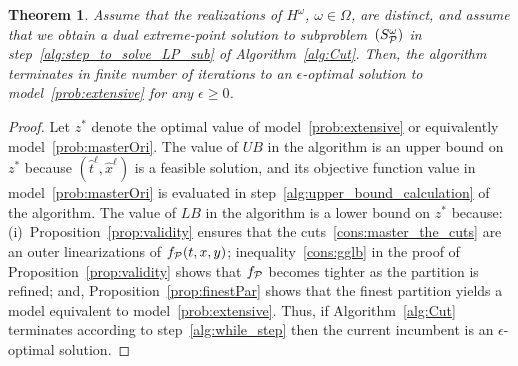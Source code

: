 \documentclass[11pt]{article}
\newtheorem{theorem}{Theorem}
\newcommand{\cP}{{\cal P}}
\begin{document}
	\begin{theorem} \label{thm:converge}
		Assume that the realizations of $H^\omega$, $\omega \in \Omega$, are distinct, and assume that we obtain a dual extreme-point solution to subproblem~\((S_{\cP}^\omega)\) in step~\ref{alg:step_to_solve_LP_sub} of Algorithm~\ref{alg:Cut}. Then, the algorithm terminates in finite number of iterations to an $\epsilon$-optimal solution to model~\eqref{prob:extensive} for any \(\epsilon \ge 0\). 
	\end{theorem}
	\begin{proof}
	Let $z^*$ denote the optimal value of model~\eqref{prob:extensive} or equivalently model~\eqref{prob:masterOri}. The value of $UB$ in the algorithm is an upper bound on $z^*$ because $(\hat{t}^\ell,\hat{x}^\ell)$ is a feasible solution, and its objective function value in model~\eqref{prob:masterOri} is evaluated in step~\ref{alg:upper_bound_calculation} of the algorithm. The value of $LB$ in the algorithm is a lower bound on $z^*$ because: (i)~Proposition~\ref{prop:validity} ensures that the cuts~\eqref{cons:master_the_cuts} are an outer linearizations of $f_{\cP}(t,x,y)$; inequality~\eqref{cons:gglb} in the proof of Proposition~\ref{prop:validity} shows that $f_{\cP}$ becomes tighter as the partition is refined; and, Proposition~\ref{prop:finestPar} shows that the finest partition yields a model equivalent to  model~\eqref{prob:extensive}. Thus, if Algorithm~\ref{alg:Cut} terminates according to step~\ref{alg:while_step} then the current incumbent is an $\epsilon$-optimal solution.      
	

\end{proof}
\end{document}
